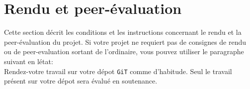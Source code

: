 \documentclass{42-fr}
\begin{document}
\chapter{Rendu et peer-\'evaluation}

    Cette section d\'ecrit les conditions et les instructions
    concernant le rendu et la peer-\'evaluation du projet. Si votre
    projet ne requiert pas de consignes de rendu ou de peer-evaluation
    sortant de l'ordinaire, vous pouvez utiliser le paragraphe suivant
    en l\'etat:\\

    Rendez-votre travail sur votre d\'epot \texttt{GiT} comme
    d'habitude. Seul le travail pr\'esent sur votre d\'epot sera
    \'evalu\'e en soutenance.



\end{document}
